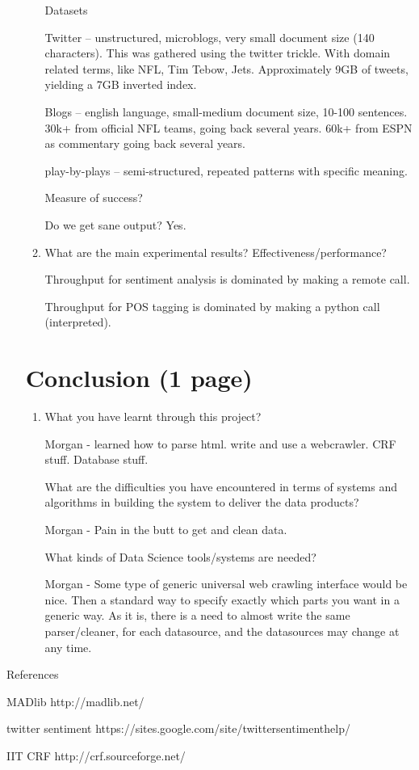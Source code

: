\documentclass{article}
\begin{document}
\begin{enumerate}
\begin{enumerate}
    Datasets

    Twitter -- unstructured, microblogs, very small document size (140 characters). This was gathered using the twitter trickle. With domain related terms, like NFL, Tim Tebow, Jets.
    Approximately 9GB of tweets, yielding a 7GB inverted index.

    Blogs -- english language, small-medium document size, 10-100 sentences.
    30k+ from official NFL teams, going back several years.
    60k+ from ESPN as commentary going back several years.

    play-by-plays -- semi-structured, repeated patterns with specific meaning.


    Measure of success?

    Do we get sane output? Yes.

  \item What are the main experimental results? Effectiveness/performance?

    Throughput for sentiment analysis is dominated by making a remote call.

    Throughput for POS tagging is dominated by making a python call (interpreted).

  \end{enumerate}

  \section{Conclusion (1 page)}
  \begin{enumerate}\item What you have learnt through this project?

    Morgan - learned how to parse html. write and use a webcrawler. CRF stuff. Database stuff.

    What are the difficulties you have encountered in terms of systems and algorithms in building the system to deliver the data products?

    Morgan - Pain in the butt to get and clean data.

    What kinds of Data Science tools/systems are needed?

    Morgan -
    Some type of generic universal web crawling interface would be nice.
    Then a standard way to specify exactly which parts you want in a generic way.
    As it is, there is a need to almost write the same parser/cleaner, for each datasource, and the datasources may change at any time.


  \end{enumerate}
\end{enumerate}

References

MADlib http://madlib.net/

twitter sentiment https://sites.google.com/site/twittersentimenthelp/

IIT CRF http://crf.sourceforge.net/
\end{document}
